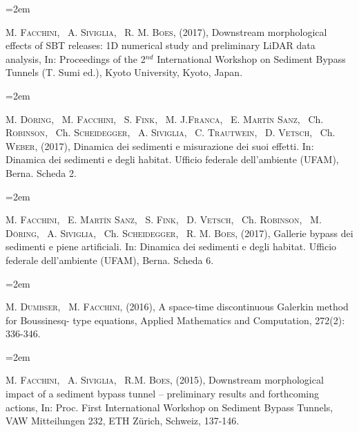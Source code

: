 \documentclass{scrartcl}
\newcommand{\MarginText}[1]{\marginpar{\raggedleft\itshape\small#1}} %
\newcommand{\Description}[1]{\hangindent=2em\hangafter=0\noindent\raggedright\footnotesize{#1}\par\normalsize\vspace{1em}} %
\begin{document}
\begin{cv}{}
\Description{\MarginText{2017}
	M. \textsc{Facchini}, ~A. \textsc{Siviglia}, ~R. M. \textsc{Boes}, (2017), Downstream morphological effects of SBT releases: 1D numerical study and preliminary LiDAR data analysis, In: Proceedings of the 2$^{nd}$ International Workshop on Sediment Bypass Tunnels (T. Sumi ed.), Kyoto University, Kyoto, Japan.}

	\Description{
	M. \textsc{Döring}, ~M. \textsc{Facchini}, ~S. \textsc{Fink}, ~M. J.\textsc{Franca}, ~E. \textsc{Martín Sanz}, ~Ch. \textsc{Robinson}, ~Ch. \textsc{Scheidegger}, ~A. \textsc{Siviglia}, ~C. \textsc{Trautwein}, ~D. \textsc{Vetsch}, ~Ch. \textsc{Weber}, (2017), Dinamica dei sedimenti e misurazione dei suoi effetti. In: Dinamica dei sedimenti e degli habitat. Ufficio federale dell’ambiente (UFAM), Berna. Scheda 2.}

	\Description{
	M. \textsc{Facchini}, ~E. \textsc{Martín Sanz}, ~S. \textsc{Fink}, ~D. \textsc{Vetsch}, ~Ch. \textsc{Robinson}, ~M. \textsc{Döring}, ~A. \textsc{Siviglia}, ~Ch. \textsc{Scheidegger}, ~R. M. \textsc{Boes}, (2017), Gallerie bypass dei sedimenti e piene artificiali. In: Dinamica dei sedimenti e degli habitat. Ufficio federale dell’ambiente (UFAM), Berna. Scheda 6.}


\Description{\MarginText{2016}
	M. \textsc{Dumbser}, ~M. \textsc{Facchini}, (2016), A space-time discontinuous Galerkin method for Boussinesq- type equations, Applied Mathematics and Computation, 272(2): 336-346.}


\Description{\MarginText{2015}
	M. \textsc{Facchini}, ~A. \textsc{Siviglia}, ~R.M. \textsc{Boes}, (2015), Downstream morphological impact of a sediment bypass tunnel – preliminary results and forthcoming actions, In: Proc. First International Workshop on Sediment Bypass Tunnels, VAW Mitteilungen 232, ETH Z\"urich, Schweiz, 137-146.}


\vspace{1em} %


\end{cv}
\end{document}
